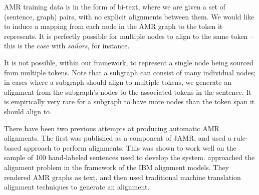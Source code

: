 
AMR training data is in the form of bi-text, where we are given a set of
  (sentence, graph) pairs, with no explicit alignments between them.
We would like to induce a mapping from each node in the AMR graph to the token it represents. 
It is perfectly possible for multiple nodes to align to the same token -- this is the case
  with \textit{sailors}, for instance. 

It is not possible, within our framework, to represent a single node being sourced from multiple tokens.
Note that a subgraph can consist of many individual nodes; in cases where a subgraph
  should align to multiple tokens, we generate an alignment from the subgraph's nodes
  to the associated tokens in the sentence.
It is empirically very rare for a subgraph to have more nodes than the token span
  it should align to.




There have been two previous attempts at producing automatic AMR alignments. 
The first was published as a component of JAMR, 
  and used a rule-based approach to perform alignments.
This was shown to work well on the sample of 100 hand-labeled sentences used to 
  develop the system.
 approached the alignment problem in 
  the framework of the IBM alignment models.
They rendered AMR graphs as text, and then used traditional machine translation 
  alignment techniques to generate an alignment.

